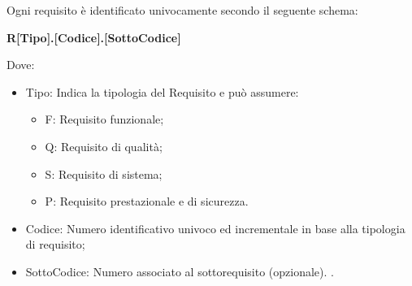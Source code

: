 
    Ogni requisito è identificato univocamente secondo il seguente schema:
        \begin{center}
            \large{\textbf{R[Tipo].[Codice].[SottoCodice]}}
        \end{center}
    Dove:
    \begin{itemize}
        \item Tipo: Indica la tipologia del Requisito e può assumere: \begin{itemize};
            \item F: Requisito funzionale;
            \item Q: Requisito di qualità;
            \item S: Requisito di sistema;
            \item P: Requisito prestazionale e di sicurezza.
        \end{itemize}

        \item Codice: Numero identificativo univoco ed incrementale in base alla tipologia di requisito;
        \item SottoCodice: Numero associato al sottorequisito (opzionale). .
    \end{itemize}
 